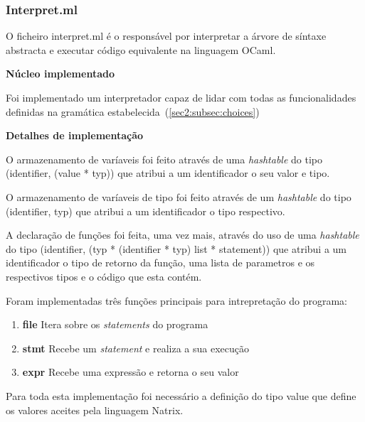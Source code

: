 \subsubsection{Interpret.ml}
\label{sec2:subsubsec:interpret}

O ficheiro interpret.ml é o responsável por interpretar a árvore de síntaxe abstracta e executar código equivalente na linguagem OCaml.

\vspace{0.5cm}

\textbf{Núcleo implementado}

\vspace{0.2cm}

Foi implementado um interpretador capaz de lidar com todas as funcionalidades definidas na gramática estabelecida~(\ref{sec2:subsec:choices})

\vspace{0.5cm}

\textbf{Detalhes de implementação}

O armazenamento de varíaveis foi feito através de uma \textit{hashtable} do tipo (identifier, (value * typ)) que atribui a um identificador o seu valor e tipo.

O armazenamento de varíaveis de tipo foi feito através de um \textit{hashtable} do tipo (identifier, typ) que atribui a um identificador o tipo respectivo.

A declaração de funções foi feita, uma vez mais, através do uso de uma \textit{hashtable} do tipo (identifier, (typ * (identifier * typ) list * statement)) que atribui a um identificador o tipo de retorno da função, uma lista de parametros e os respectivos tipos e o código que esta contém.

Foram implementadas três funções principais para intrepretação do programa:

\begin{enumerate}
  \item \textbf{file} Itera sobre os \textit{statements} do programa
  \item \textbf{stmt} Recebe um \textit{statement} e realiza a sua execução
  \item \textbf{expr} Recebe uma expressão e retorna o seu valor
\end{enumerate}

Para toda esta implementação foi necessário a definição do tipo value que define os valores aceites pela linguagem Natrix.


